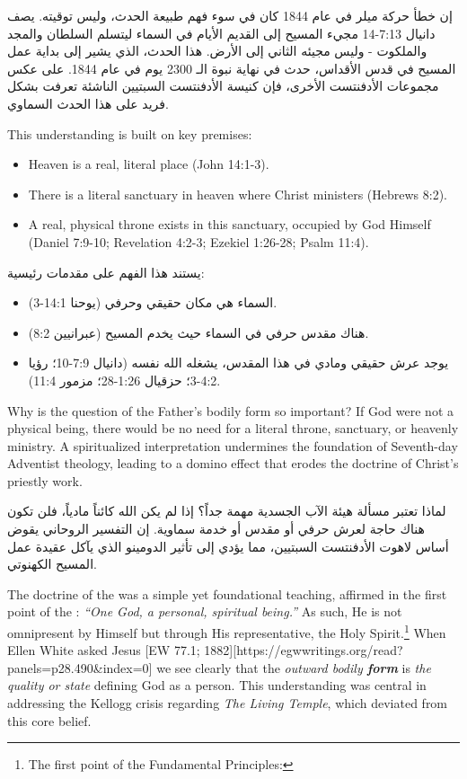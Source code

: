 إن خطأ حركة ميلر في عام 1844 كان في سوء فهم طبيعة الحدث، وليس توقيته. يصف دانيال 7:13-14 مجيء المسيح إلى القديم الأيام في السماء ليتسلم السلطان والمجد والملكوت - وليس مجيئه الثاني إلى الأرض. هذا الحدث، الذي يشير إلى بداية عمل المسيح في قدس الأقداس، حدث في نهاية نبوة الـ 2300 يوم في عام 1844. على عكس مجموعات الأدفنتست الأخرى، فإن كنيسة الأدفنتست السبتيين الناشئة تعرفت بشكل فريد على هذا الحدث السماوي.


This understanding is built on key premises:
\begin{itemize}
    \item Heaven is a real, literal place (John 14:1-3).
    \item There is a literal sanctuary in heaven where Christ ministers (Hebrews 8:2). 
    \item A real, physical throne exists in this sanctuary, occupied by God Himself (Daniel 7:9-10; Revelation 4:2-3; Ezekiel 1:26-28; Psalm 11:4).
\end{itemize}


يستند هذا الفهم على مقدمات رئيسية:
\begin{itemize}
    \item السماء هي مكان حقيقي وحرفي (يوحنا 14:1-3).
    \item هناك مقدس حرفي في السماء حيث يخدم المسيح (عبرانيين 8:2).
    \item يوجد عرش حقيقي ومادي في هذا المقدس، يشغله الله نفسه (دانيال 7:9-10؛ رؤيا 4:2-3؛ حزقيال 1:26-28؛ مزمور 11:4).
\end{itemize}


Why is the question of the Father’s bodily form so important? If God were not a physical being, there would be no need for a literal throne, sanctuary, or heavenly ministry. A spiritualized interpretation undermines the foundation of Seventh-day Adventist theology, leading to a domino effect that erodes the doctrine of Christ’s priestly work.


لماذا تعتبر مسألة هيئة الآب الجسدية مهمة جداً؟ إذا لم يكن الله كائناً مادياً، فلن تكون هناك حاجة لعرش حرفي أو مقدس أو خدمة سماوية. إن التفسير الروحاني يقوض أساس لاهوت الأدفنتست السبتيين، مما يؤدي إلى تأثير الدومينو الذي يآكل عقيدة عمل المسيح الكهنوتي.


The doctrine of the  was a simple yet foundational teaching, affirmed in the first point of the : \textit{“One God, a personal, spiritual being.”} As such, He is not omnipresent by Himself but through His representative, the Holy Spirit.\footnote{The first point of the Fundamental Principles: } When Ellen White asked Jesus [EW 77.1; 1882][https://egwwritings.org/read?panels=p28.490&index=0] we see clearly that the \textit{outward bodily \textbf{form}} is \textit{the quality or state} defining God as a person. This understanding was central in addressing the Kellogg crisis regarding \textit{The Living Temple}, which deviated from this core belief.



